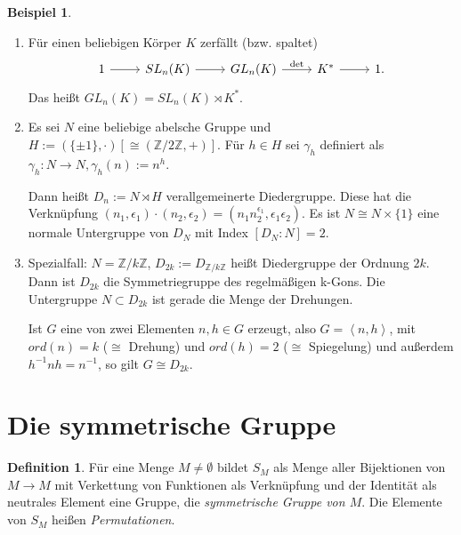 \documentclass[12pt]{scrartcl}%
\theoremstyle{definition}
\newtheorem*{defn}{Definition}
\newtheorem{ex}{Beispiel}
\theoremstyle{remark}
\begin{document}
\begin{ex}

\begin{enumerate}[label=(\alph*)]
    \item Für einen beliebigen Körper $K$ zerfällt (bzw. spaltet)
    \[ \begin{tikzcd}
         1 \arrow[r] & SL_n(K) \arrow[r] & GL_n(K) \arrow[r,"\det"] & K^* \arrow[r] & 1.
    \end{tikzcd} \]
    Das heißt $GL_n(K) = SL_n(K)\rtimes K^*$.
    
    \item Es sei $N$ eine beliebige abelsche Gruppe und $H := (\{\pm 1\},\cdot)\left[\cong(\mathbb{Z}/2\mathbb{Z},+)\right]$. Für $h\in H$ sei $\gamma_h$ definiert als $\gamma_h:N\to N, \gamma_h(n) := n^h$.
    
    Dann heißt $D_n := N \rtimes H$ verallgemeinerte Diedergruppe. Diese hat die Verknüpfung 
    $(n_1,\epsilon_1)\cdot(n_2,\epsilon_2) = (n_1 n_2^{\epsilon_1},\epsilon_1\epsilon_2)$. Es ist $N \cong N\times\{1\}$ eine normale Untergruppe von $D_N$ mit Index $[D_N:N] = 2$.
    
    \item Spezialfall: $N = \mathbb{Z}/k\mathbb{Z}$, $D_{2k} := D_{\mathbb{Z}/k\mathbb{Z}}$ heißt Diedergruppe der Ordnung $2k$. Dann ist $D_{2k}$ die Symmetriegruppe des regelmäßigen k-Gons. Die Untergruppe $N\subset D_{2k}$ ist gerade die Menge der Drehungen.
    
    Ist $G$ eine von zwei Elementen $n,h\in G$ erzeugt, also $G = \left< n,h\right>$, mit $ord(n) = k$ ($\cong$ Drehung) und $ord(h) = 2$ ($\cong$ Spiegelung) und außerdem $h^{-1}nh=n^{-1}$, so gilt $G\cong D_{2k}$.
\end{enumerate}

\end{ex}

\section{Die symmetrische Gruppe}

\begin{defn}
    Für eine Menge $M\neq\emptyset$ bildet $S_M$ als Menge aller Bijektionen von $M\to M$ mit Verkettung von Funktionen als Verknüpfung und der Identität als neutrales Element eine Gruppe, die \emph{symmetrische Gruppe von $M$}. Die Elemente von $S_M$ heißen \emph{Permutationen}.
\end{defn}
\end{document}
